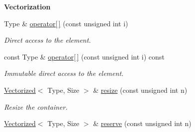 \begin{Indent}{\bf Vectorization}\par
\begin{DoxyCompactItemize}
\item 
Type \& \hyperlink{exceptionmagrathea_1_1Vectorized_a0f3d97c9455a9471bf2a25ca23b43415}{operator\mbox{[}$\,$\mbox{]}} (const unsigned int i)
\begin{DoxyCompactList}\small\item\em Direct access to the element. \end{DoxyCompactList}\item 
const Type \& \hyperlink{exceptionmagrathea_1_1Vectorized_af11c4c126a67c88dc87eb4e363542a0e}{operator\mbox{[}$\,$\mbox{]}} (const unsigned int i) const 
\begin{DoxyCompactList}\small\item\em Immutable direct access to the element. \end{DoxyCompactList}\item 
\hyperlink{exceptionmagrathea_1_1Vectorized}{Vectorized}$<$ Type, Size $>$ \& \hyperlink{exceptionmagrathea_1_1Vectorized_a8c12527eaae803374f413aff65141c3a}{resize} (const unsigned int n)
\begin{DoxyCompactList}\small\item\em Resize the container. \end{DoxyCompactList}\item 
\hyperlink{exceptionmagrathea_1_1Vectorized}{Vectorized}$<$ Type, Size $>$ \& \hyperlink{exceptionmagrathea_1_1Vectorized_abd2af5679ec375ba7ece2dac64d4764d}{reserve} (const unsigned int n)
\end{DoxyCompactItemize}
\end{Indent}
